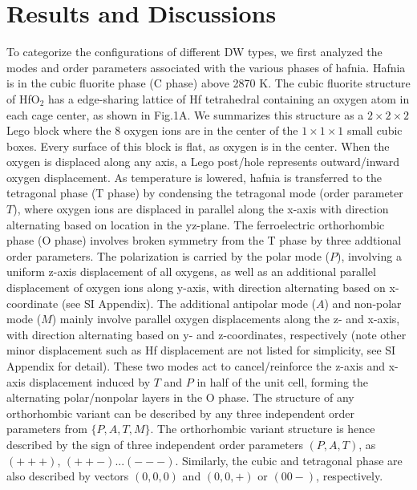 \documentclass[12pt]{article}
\begin{document}
\section*{Results and Discussions}
To categorize the configurations of different DW types, we first analyzed the modes and order parameters associated with the various phases of hafnia. 
Hafnia is in the cubic fluorite phase (C phase) above 2870 K\cite{terki08p1484}.
The cubic fluorite structure of HfO$_2$ has a edge-sharing lattice of Hf tetrahedral containing an oxygen atom in each cage center, as shown in Fig.1A.
We summarizes this structure as a $2\times2\times2$ Lego block where the 8 oxygen ions are in the center of the  $1\times1\times1$ small cubic boxes. 
Every surface of this block is flat, as oxygen is in the center. 
When the oxygen is displaced along any axis, a Lego post/hole represents outward/inward oxygen displacement.
As temperature is lowered, hafnia is transferred to the tetragonal phase (T phase) by condensing the tetragonal mode (order parameter $T$), where oxygen ions are displaced in parallel along the x-axis with direction alternating based on location in the yz-plane.
The ferroelectric orthorhombic phase (O phase) involves broken symmetry from the T phase by three addtional order parameters. 
The polarization is carried by the polar mode ($P$), involving a uniform z-axis displacement of all oxygens, as well as an additional parallel displacement of oxygen ions along y-axis, with direction alternating based on x-coordinate (see SI Appendix).
The additional antipolar mode ($A$) and non-polar mode ($M$) mainly involve parallel oxygen displacements along the z- and x-axis, with direction alternating based on y- and z-coordinates, respectively (note other minor displacement such as Hf displacement are not listed for simplicity, see SI Appendix for detail). 
These two modes act to cancel/reinforce the z-axis and x-axis displacement induced by $T$ and $P$ in half of the unit cell, forming the alternating polar/nonpolar layers in the O phase.
The structure of any orthorhombic variant can be described by any three independent order parameters from $\{P, A, T, M\}$.
The orthorhombic variant structure is hence described by the sign of three independent order parameters $(P,A,T)$, as $(+++)$, $(++-)$...$(---)$.
Similarly, the cubic and tetragonal phase are also described by vectors $(0,0,0)$ and $(0,0,+)$ or $(00-)$, respectively.
\end{document}
